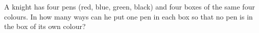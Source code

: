 A knight has four pens (red, blue, green, black) and four boxes of the same four colours. In how many ways can he put one pen in each box so that no pen is in the box of its own colour?
